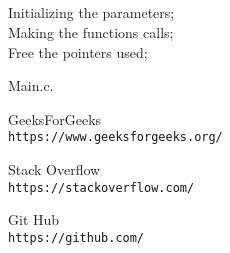 \documentclass{report}
\begin{document}
\subsection*{}

\begin{algorithm}[H]
    {Initializing the parameters;}
    \\
    {Making the functions calls;}
    \\
    {Free the pointers used;}
    \caption{Main.c.}
\end{algorithm}


\begin{thebibliography}{9}
GeeksForGeeks
\\\texttt{https://www.geeksforgeeks.org/}

Stack Overflow
\\\texttt{https://stackoverflow.com/}

Git Hub
\\\texttt{https://github.com/}

\end{thebibliography}
\end{document}
